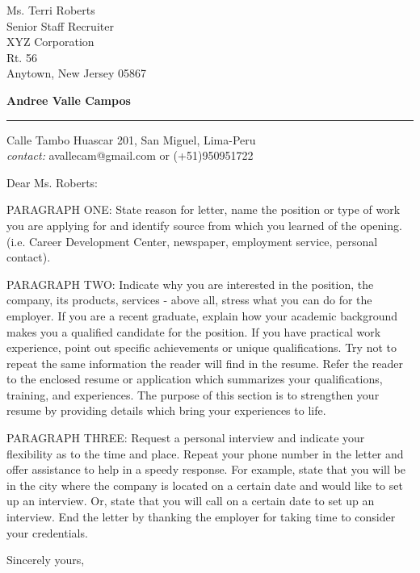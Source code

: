 \documentclass{letter} %
\begin{document}
\signature{Andree Valle Campos}           %
\longindentation=0pt                       %
\let\raggedleft\raggedright                %
 
 
\begin{letter}{Ms. Terri Roberts \\
Senior Staff Recruiter \\
XYZ Corporation \\
Rt. 56 \\
Anytown, New Jersey 05867}


\begin{flushleft}
{\large\bf Andree Valle Campos}
\end{flushleft}
\medskip\hrule height 1pt
\begin{flushright}
\hfill Calle Tambo Huascar 201, San Miguel, Lima-Peru \\
\hfill \textit{contact:} avallecam@gmail.com or (+51)950951722
\end{flushright} 
\vfill %

 
\opening{Dear Ms. Roberts:} 
 
\noindent PARAGRAPH ONE: State reason for letter, name the position or type 
of work you are applying for and identify source from  which  you 
learned   of   the  opening.  (i.e.  Career  Development  Center, 
newspaper, employment service, personal contact). 
 
\noindent PARAGRAPH  TWO:  Indicate why you are interested in the position, 
the company, its products, services - above all, stress what  you 
can  do  for  the employer. If you are a recent graduate, explain 
how your academic background makes you a qualified candidate  for 
the  position.  If  you have practical work experience, point out 
specific achievements or unique qualifications. Try not to repeat 
the  same  information  the reader will find in the resume. Refer 
the reader to the enclosed resume or application which summarizes 
your  qualifications,  training,  and experiences. The purpose of 
this section is to strengthen your resume  by  providing  details 
which bring your experiences to life. 
 
\noindent PARAGRAPH THREE: Request a personal interview and  indicate  your 
flexibility as to the time and place. Repeat your phone number in 
the letter and offer assistance to help in a speedy response. For 
example,  state that you will be in the city where the company is 
located on a certain date and would like to set up an  interview. 
Or,  state  that  you  will  call  on a certain date to set up an 
interview. End the letter by thanking  the  employer  for  taking 
time to consider your credentials. 
 
\closing{Sincerely yours,} 
 

 
\encl{}  				%

\end{letter}
 
\end{document}
